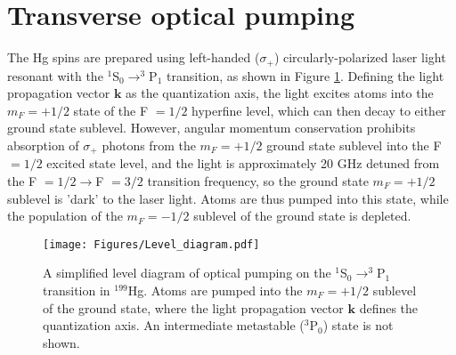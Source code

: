 \documentclass [10pt, twoside] {uwthesis}[2012/04/02]
\begin{document}
\section{Transverse optical pumping}
The Hg spins are prepared using left-handed ($\sigma_+$) circularly-polarized laser light resonant with the $^1$S$_0\rightarrow^3$P$_1$ transition, as shown in Figure \ref{OpticalPump}. Defining the light propagation vector $\mathbf{k}$ as the quantization axis, the light excites atoms into the $m_F=+1/2$ state of the F $=1/2$ hyperfine level, which can then decay to either ground state sublevel. However, angular momentum conservation prohibits absorption of $\sigma_+$ photons from the $m_F=+1/2$ ground state sublevel into the F $=1/2$ excited state level, and the light is approximately 20 GHz detuned from the F $= 1/2 \rightarrow $F $= 3/2$ transition frequency, so the ground state $m_F=+1/2$ sublevel is 'dark' to the laser light. Atoms are thus pumped into this state, while the population of the $m_F=-1/2$ sublevel of the ground state is depleted. 
\begin{figure}
\begin{center}
\texttt{[image: Figures/Level\_diagram.pdf]}
\end{center}
\caption[Optical pumping diagram for F = 1/2]%
{\narrower A simplified level diagram of optical pumping on the $^1$S$_0\rightarrow^3$P$_1$ transition in $^{199}$Hg. Atoms are pumped into the $m_F=+1/2$ sublevel of the ground state, where the light propagation vector $\mathbf{k}$ defines the quantization axis. An intermediate metastable ($^3$P$_0$) state is not shown.}
\label{OpticalPump}
\end{figure}
\end{document}
